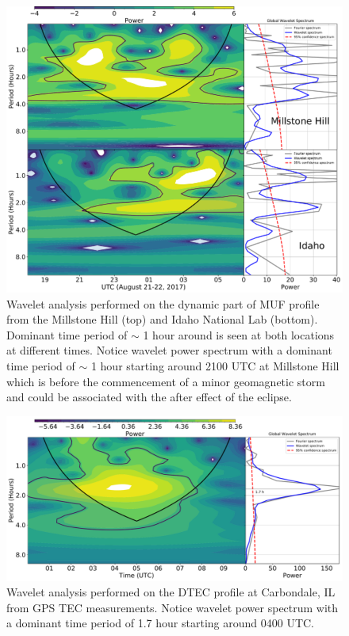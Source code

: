     \begin{figure}
 \centering\includegraphics[width=35pc]{muf_digi_wavelet.pdf}
 \caption{Wavelet analysis performed on the dynamic part of MUF profile from the Millstone Hill (top) and  Idaho National Lab (bottom). Dominant time period of $\sim$ 1 hour around is seen at both locations at different times. Notice wavelet power spectrum with a dominant time period of $\sim$ 1 hour starting around 2100 UTC at Millstone Hill which is before the commencement of a minor geomagnetic storm and could be associated with the after effect of the eclipse. }
 \label{fig:muf_wv}
 \end{figure}
     \begin{figure}
 \centering\includegraphics[width=35pc]{dtec.pdf}
 \caption{Wavelet analysis performed on the DTEC profile at Carbondale, IL from GPS TEC measurements.  Notice wavelet power spectrum with a dominant time period of 1.7 hour starting around 0400 UTC.}
 \label{fig:wav_tec}
 \end{figure} 
 
